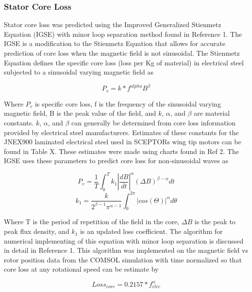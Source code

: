 \documentclass[]{aiaa-tc}%
\begin{document}
\subsubsection{Stator Core Loss}
Stator core loss was predicted using the Improved Generalized Stienmetz Equation (IGSE) with minor loop separation method found in Reference 1. The IGSE is a modification to the Stienmetz Equation that allows for accurate prediction of core loss when the magnetic field is not sinusoidal. The Stienmetz Equation defines the specific core loss (loss per Kg of material) in electrical steel subjected to a sinusoidal varying magnetic field as

\begin{equation}
P_{v} = k*f^{alpha}B^{\beta}
\label{eq:CoreLoss}
\end{equation}

Where $P_v$ is specific core loss, f is the frequency of the sinusoidal varying magnetic field, B is the peak value of the field, 
and $k$, $\alpha$, and $\beta$ are material constants. $k$, $\alpha$, and $\beta$  
can generally be determined from core loss information provided by electrical steel manufacturers. 
Estimates of these constants for the JNEX900 laminated electrical steel used in SCEPTORs wing tip motors can be found in Table X. 
These estimates were made using charts found in Ref 2. The IGSE uses these parameters to predict core loss for non-sinusoidal waves as


\begin{equation}
P_{v} = \frac{1}{T}\int_{0}^{T}k_{1}|\frac{dB}{dt}|^{\alpha}(\Delta B)^{\beta-\alpha}dt
\label{eq:CoreLoss2}
\end{equation}
\begin{equation}
k_{1} = \frac{k}{2^{\beta-1}\pi^{\alpha-1}}\int_{0}^{2\pi}|cos(\Theta)|^{\alpha}d\theta
\label{eq:CoreLoss2}
\end{equation}

Where T is the period of repetition of the field in the core, $\Delta B$ is the peak to peak flux density, and $k_{1}$ is an updated loss coefficient. The algorithm for numerical implementing of this equation with minor loop separation is discussed in detail in Reference 1. This algorithm was implemented on the magnetic field vs rotor position data from the COMSOL simulation with time normalized so that core loss at any rotational speed can be estimate by

\begin{equation}
Loss_{core} = 0.2157*f_{elec}^{\alpha}
\label{eq:CoreLoss3}
\end{equation}
\end{document}
